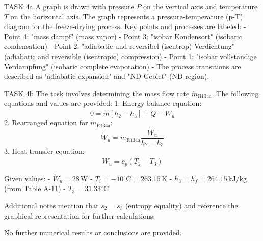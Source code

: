 TASK 4a  
A graph is drawn with pressure \( P \) on the vertical axis and temperature \( T \) on the horizontal axis. The graph represents a pressure-temperature (p-T) diagram for the freeze-drying process. Key points and processes are labeled:  
- Point 4: "mass dampf" (mass vapor)  
- Point 3: "isobar Kondensort" (isobaric condensation)  
- Point 2: "adiabatic und reversibel (isentrop) Verdichtung" (adiabatic and reversible (isentropic) compression)  
- Point 1: "isobar vollständige Verdampfung" (isobaric complete evaporation)  
- The process transitions are described as "adiabatic expansion" and "ND Gebiet" (ND region).  

TASK 4b  
The task involves determining the mass flow rate \( \dot{m}_{\text{R134a}} \). The following equations and values are provided:  
1. Energy balance equation:  
\[
0 = \dot{m} \left[ h_2 - h_3 \right] + \dot{Q} - \dot{W}_u
\]  
2. Rearranged equation for \( \dot{m}_{\text{R134a}} \):  
\[
\dot{W}_u = \dot{m}_{\text{R134a}} \frac{\dot{W}_u}{h_2 - h_3}
\]  
3. Heat transfer equation:  
\[
\dot{W}_u = c_p \left( T_2 - T_3 \right)
\]  

Given values:  
- \( \dot{W}_u = 28 \, \text{W} \)  
- \( T_i = -10^\circ\text{C} = 263.15 \, \text{K} \)  
- \( h_3 = h_f = 264.15 \, \text{kJ/kg} \) (from Table A-11)  
- \( T_3 = 31.33^\circ\text{C} \)  

Additional notes mention that \( s_2 = s_3 \) (entropy equality) and reference the graphical representation for further calculations.  

No further numerical results or conclusions are provided.